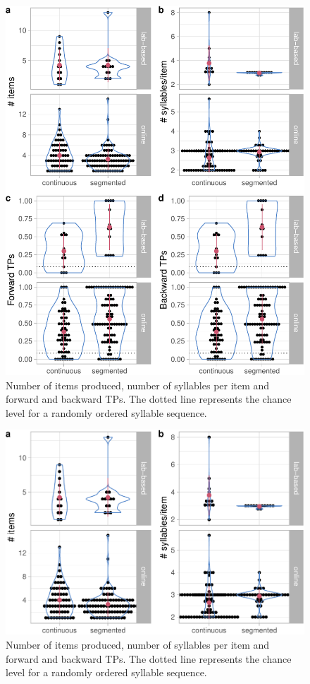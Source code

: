\documentclass[
]{article}
\begin{document}
\begin{figure}

{\centering \includegraphics[width=0.8\linewidth]{segmentation_recall_combined_for_revision3_files/figure-latex/recall-general-measures-tp-plot-1} 

}

\caption{Number of items produced, number of syllables per item and forward and backward TPs. The dotted line represents the chance level for a randomly ordered syllable sequence.}\label{fig:recall-general-measures-tp-plot}
\end{figure}

\begin{figure}

{\centering \includegraphics[width=0.8\linewidth]{segmentation_recall_combined_for_revision3_files/figure-latex/recall-general-measures-tp-plot-n-items-sylls-1} 

}

\caption{Number of items produced, number of syllables per item and forward and backward TPs. The dotted line represents the chance level for a randomly ordered syllable sequence.}\label{fig:recall-general-measures-tp-plot-n-items-sylls}
\end{figure}
\end{document}

